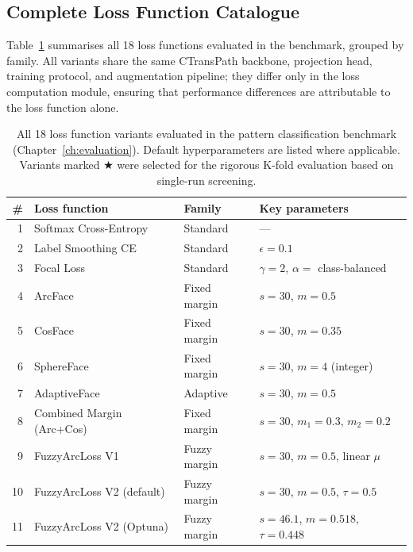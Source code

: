 \subsection{Complete Loss Function Catalogue}
\label{sec:bg:loss_catalogue}

Table~\ref{tab:loss_variants_bg} summarises all 18 loss functions evaluated in the benchmark, grouped by family.
All variants share the same CTransPath backbone, projection head, training protocol, and augmentation pipeline; they differ only in the loss computation module, ensuring that performance differences are attributable to the loss function alone.

\begin{table}[ht!]
\centering
\small
\caption{All 18 loss function variants evaluated in the pattern classification benchmark (Chapter~\ref{ch:evaluation}).
Default hyperparameters are listed where applicable.
Variants marked $\bigstar$ were selected for the rigorous K-fold evaluation based on single-run screening.}
\label{tab:loss_variants_bg}
\begin{tabular}{r l l l}
\hline
\textbf{\#} & \textbf{Loss function} & \textbf{Family} & \textbf{Key parameters} \\
\hline
1  & Softmax Cross-Entropy        & Standard       & --- \\
2  & Label Smoothing CE           & Standard       & $\epsilon = 0.1$ \\
3  & Focal Loss                   & Standard       & $\gamma = 2$, $\alpha = $ class-balanced \\
\hline
4  & ArcFace                      & Fixed margin   & $s = 30$, $m = 0.5$ \\
5  & CosFace                      & Fixed margin   & $s = 30$, $m = 0.35$ \\
6  & SphereFace                   & Fixed margin   & $s = 30$, $m = 4$ (integer) \\
7  & AdaptiveFace                 & Adaptive       & $s = 30$, $m = 0.5$ \\
8  & Combined Margin (Arc+Cos)    & Fixed margin   & $s = 30$, $m_1 = 0.3$, $m_2 = 0.2$ \\
\hline
9  & FuzzyArcLoss V1              & Fuzzy margin   & $s = 30$, $m = 0.5$, linear $\mu$ \\
10 & FuzzyArcLoss V2 (default)    & Fuzzy margin   & $s = 30$, $m = 0.5$, $\tau = 0.5$ \\
11 & FuzzyArcLoss V2 (Optuna)     & Fuzzy margin   & $s = 46.1$, $m = 0.518$, $\tau = 0.448$ \\

\end{tabular}
\end{table}
